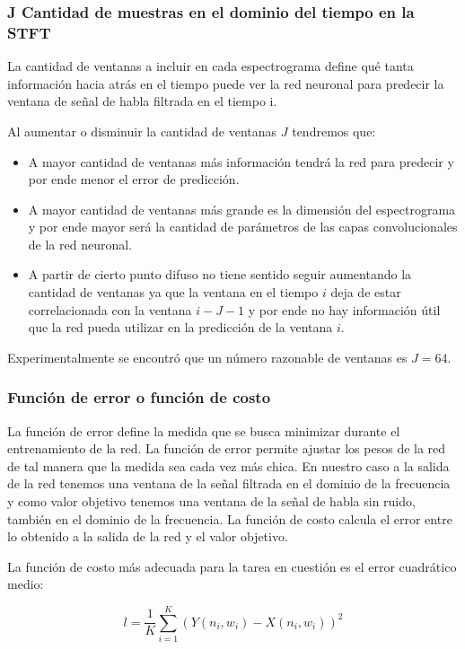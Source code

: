 \subsubsection{J Cantidad de muestras en el dominio del tiempo en la STFT}
\label{sec:ventanas_en_espectrogramas}

La cantidad de ventanas a incluir en cada espectrograma define qué tanta información hacia atrás en el tiempo puede ver la red neuronal para predecir la ventana de señal de habla filtrada en el tiempo i. 

Al aumentar o disminuir la cantidad de ventanas $J$ tendremos que:

\begin{itemize}
	\item A mayor cantidad de ventanas más información tendrá la red para predecir y por ende menor el error de predicción.
	\item A mayor cantidad de ventanas más grande es la dimensión del espectrograma y por ende mayor será la cantidad de parámetros de las capas convolucionales de la red neuronal.
	\item A partir de cierto punto difuso no tiene sentido seguir aumentando la cantidad de ventanas ya que la ventana en el tiempo $i$ deja de estar correlacionada con la ventana $i - J - 1$ y por ende no hay información útil que la red pueda utilizar en la predicción de la ventana $i$.
\end{itemize}

Experimentalmente se encontró que un número razonable de ventanas es $J=64$.

\subsubsection{Función de error o función de costo}

La función de error define la medida que se busca minimizar durante el entrenamiento de la red. La función de error permite ajustar los pesos de la red de tal manera que la medida sea cada vez más chica. En nuestro caso a la salida de la red tenemos una ventana de la señal filtrada en el dominio de la frecuencia y como valor objetivo tenemos una ventana de la señal de habla sin ruido, también en el dominio de la frecuencia. La función de costo calcula el error entre lo obtenido a la salida de la red y el valor objetivo. 

La función de costo más adecuada para la tarea en cuestión es el error cuadrático medio:

\begin{equation*}
	l = \frac{1}{K} \sum_{i=1}^K (Y(n_i, w_i) - X(n_i, w_i))^2
\end{equation*}

